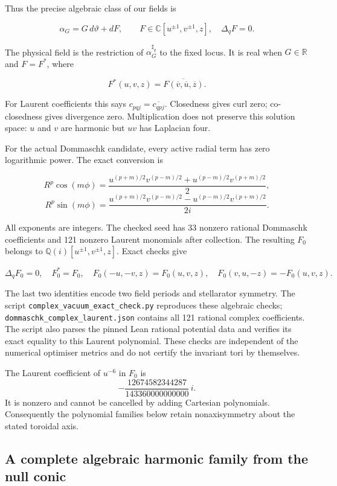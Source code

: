 Thus the precise algebraic class of our fields is

\[
\alpha_G=G\,d\vartheta+dF,\qquad
F\in\mathbb C[u^{\pm1},v^{\pm1},z],\quad \Delta_qF=0.
\]

The physical field is the restriction of \(\alpha_G^{\sharp_q}\) to the fixed locus. It is real when \(G\in\mathbb R\) and \(F=F^*\), where

\[
F^*(u,v,z)=\overline{F(\overline v,\overline u,\overline z)}.
\]

For Laurent coefficients this says \(c_{pqj}=\overline{c_{qpj}}\). Closedness gives curl zero; co-closedness gives divergence zero. Multiplication does not preserve this solution space: \(u\) and \(v\) are harmonic but \(uv\) has Laplacian four.

For the actual Dommaschk candidate, every active radial term has zero logarithmic power. The exact conversion is

\[
R^p\cos(m\phi)=\frac{u^{(p+m)/2}v^{(p-m)/2}+u^{(p-m)/2}v^{(p+m)/2}}2,
\] \[
R^p\sin(m\phi)=\frac{u^{(p+m)/2}v^{(p-m)/2}-u^{(p-m)/2}v^{(p+m)/2}}{2i}.
\]

All exponents are integers. The checked seed has 33 nonzero rational Dommaschk coefficients and 121 nonzero Laurent monomials after collection. The resulting \(F_0\) belongs to \(\mathbb Q(i)[u^{\pm1},v^{\pm1},z]\). Exact checks give

\[
\Delta_qF_0=0,\quad F_0^*=F_0,\quad
F_0(-u,-v,z)=F_0(u,v,z),\quad
F_0(v,u,-z)=-F_0(u,v,z).
\]

The last two identities encode two field periods and stellarator symmetry. The script \texttt{complex\_vacuum\_exact\_check.py} reproduces these algebraic checks; \texttt{dommaschk\_complex\_laurent.json} contains all 121 rational complex coefficients. The script also parses the pinned Lean rational potential data and verifies its exact equality to this Laurent polynomial. These checks are independent of the numerical optimiser metrics and do not certify the invariant tori by themselves.

The Laurent coefficient of \(u^{-6}\) in \(F_0\) is
\[
-\frac{12674582344287}{143360000000000}\,i.
\]
It is nonzero and cannot be cancelled by adding Cartesian polynomials. Consequently the polynomial families below retain nonaxisymmetry about the stated toroidal axis.


\subsection{A complete algebraic harmonic family from the null conic}\label{a-complete-algebraic-harmonic-family-from-the-null-conic}

